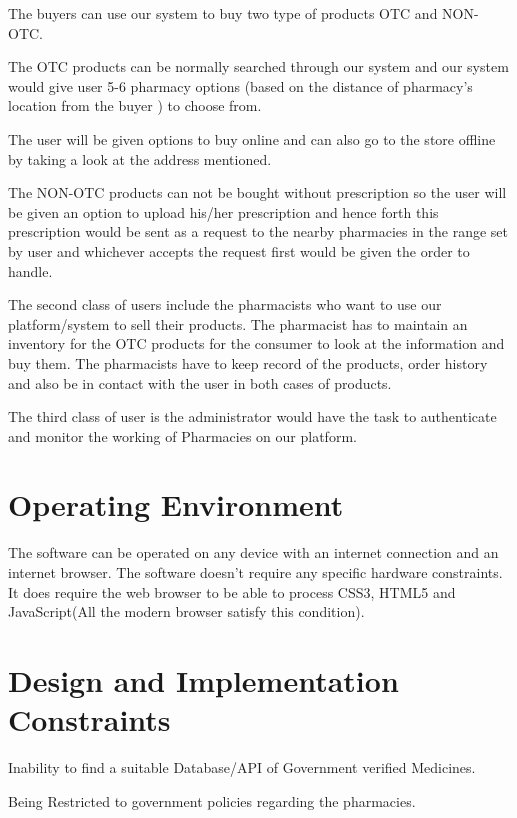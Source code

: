 \documentclass{scrreprt}
\begin{document}
\item The buyers can use our system to buy two type of products OTC and NON-OTC.   \\

\item The OTC products can be normally searched through our system and our system would give user 5-6 pharmacy options (based on the distance of pharmacy’s location from the buyer ) to choose from.     \\

\item The user will be given options to buy online and can also go to the store offline by taking a look at the address mentioned.  \\

\item The NON-OTC products can not be bought without prescription so the user will be given an option to upload his/her prescription and hence forth this prescription would be sent as a request to the nearby pharmacies in the range set by user and whichever accepts the request first would be given the order to handle.   \\

\item The second class of users include the pharmacists who want to use our platform/system to sell their products. The pharmacist has to maintain an inventory for the OTC products for the consumer to look at the information and buy them. The pharmacists have to keep record of the products, order history and also be in contact with the user in both cases of products.   \\

\item The third class of user is the administrator would have the task to authenticate and monitor the working of Pharmacies on our platform.   \\


\section{Operating Environment}
The software can be operated on any device with an internet connection and an internet browser. The software doesn’t require any specific hardware constraints. It does require the web browser to be able to process CSS3, HTML5 and JavaScript(All the modern browser satisfy this condition).


\section{Design and Implementation Constraints}
\item Inability to find a suitable Database/API of Government verified Medicines.
\item Being Restricted to government policies regarding the pharmacies.
\end{document}
